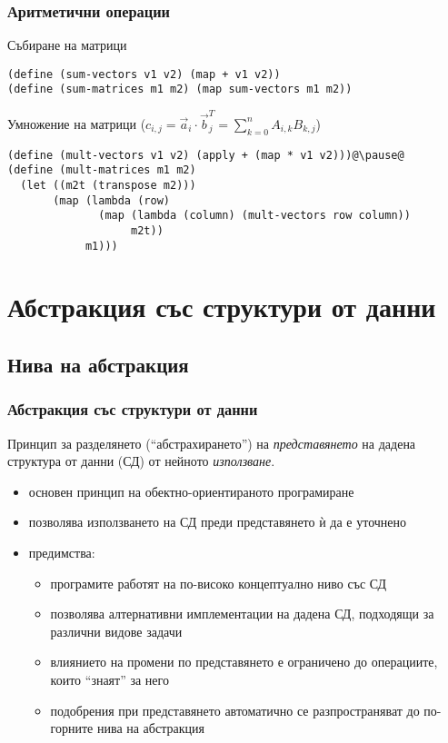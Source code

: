 \documentclass[alsotrans]{beamerswitch}
\begin{document}
\begin{frame}[fragile]
  \frametitle{Аритметични операции}

  Събиране на матрици
  \pause
\begin{lstlisting}
(define (sum-vectors v1 v2) (map + v1 v2))
(define (sum-matrices m1 m2) (map sum-vectors m1 m2))
\end{lstlisting}
  \pause
  \vspace{2ex}
  Умножение на матрици \pause
  ($c_{i,j} = \vec a_i\cdot \vec b^T_j = \sum_{k=0}^n A_{i,k}B_{k,j}$)
  \pause
  \small
\begin{lstlisting}
(define (mult-vectors v1 v2) (apply + (map * v1 v2)))@\pause@
(define (mult-matrices m1 m2)
  (let ((m2t (transpose m2)))
       (map (lambda (row)
              (map (lambda (column) (mult-vectors row column))
                   m2t))
            m1)))
\end{lstlisting}
\end{frame}

\section{Абстракция със структури от данни}

\subsection{Нива на абстракция}

\begin{frame}[<+->]
  \frametitle{Абстракция със структури от данни}

  \begin{definition}[Абстракция]
    Принцип за разделянето (``абстрахирането'') на \emph{представянето} на дадена структура от данни (СД) от нейното \emph{използване}.
  \end{definition}
  \begin{itemize}
  \item основен принцип на обектно-ориентираното програмиране
  \item позволява използването на СД преди представянето ѝ да е уточнено
  \item предимства:
    \begin{itemize}
    \item програмите работят на по-високо концептуално ниво със СД
    \item позволява алтернативни имплементации на дадена СД, подходящи за различни видове задачи
    \item влиянието на промени по представянето е ограничено до операциите, които ``знаят'' за него
    \item подобрения при представянето автоматично се разпространяват до по-горните нива на абстракция
    \end{itemize}
  \end{itemize}
\end{frame}
\end{document}
